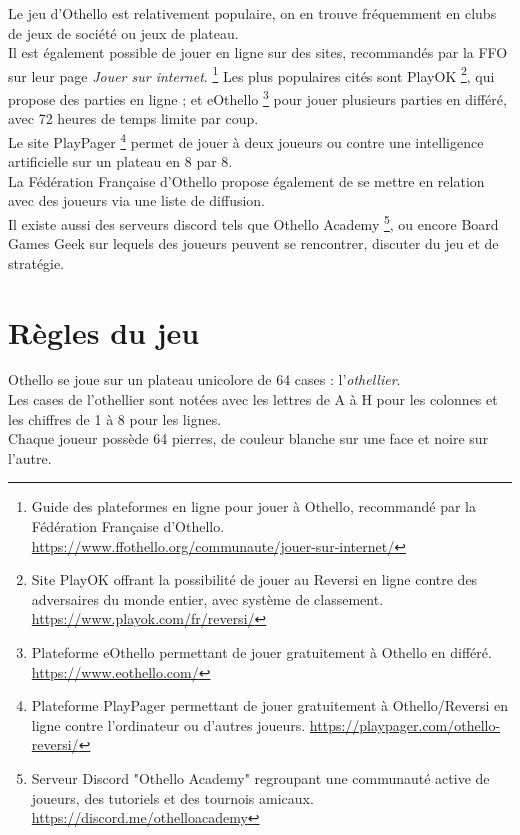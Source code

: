 \documentclass[a4paper,12pt]{article}
\begin{document}
Le jeu d’Othello est relativement populaire, on en trouve fréquemment en clubs
de jeux de société ou jeux de plateau.\\ Il est également possible de jouer en
ligne sur des sites, recommandés par la FFO sur leur page \textit{Jouer sur
    internet}.\cite{FFOthelloJouerInternet} \footnote{Guide des plateformes en
    ligne pour jouer à Othello, recommandé par la Fédération Française d'Othello.
    \url{https://www.ffothello.org/communaute/jouer-sur-internet/}} Les plus
populaires cités sont PlayOK\cite{PlayOKReversi} \footnote{Site PlayOK offrant
    la possibilité de jouer au Reversi en ligne contre des adversaires du monde
    entier, avec système de classement. \url{https://www.playok.com/fr/reversi/}},
qui propose des parties en ligne ; et eOthello \footnote{Plateforme eOthello
    permettant de jouer gratuitement à Othello en différé.
    \url{https://www.eothello.com/}} pour jouer plusieurs parties en différé, avec
72 heures de temps limite par coup.\\ Le site PlayPager\cite{PlayPagerOthello}
\footnote{Plateforme PlayPager permettant de jouer gratuitement à
    Othello/Reversi en ligne contre l'ordinateur ou d'autres joueurs.
    \url{https://playpager.com/othello-reversi/}} permet de jouer à deux joueurs ou
contre une intelligence artificielle sur un plateau en 8 par 8.\\ La Fédération
Française d’Othello propose également de se mettre en relation avec des joueurs
via une liste de diffusion.\\ Il existe aussi des serveurs discord tels que
Othello Academy \footnote{Serveur Discord "Othello Academy" regroupant une
    communauté active de joueurs, des tutoriels et des tournois amicaux.
    \url{https://discord.me/othelloacademy}}, ou encore Board Games Geek sur
lequels des joueurs peuvent se rencontrer, discuter du jeu et de stratégie.\\

\newpage

\section{Règles du jeu}

Othello se joue sur un plateau unicolore de 64 cases : l’\textit{othellier}. \\
Les cases de l’othellier sont notées avec les lettres de A à H pour les
colonnes et les chiffres de 1 à 8 pour les lignes. \\ Chaque joueur possède 64
pierres, de couleur blanche sur une face et noire sur l’autre.
\end{document}
